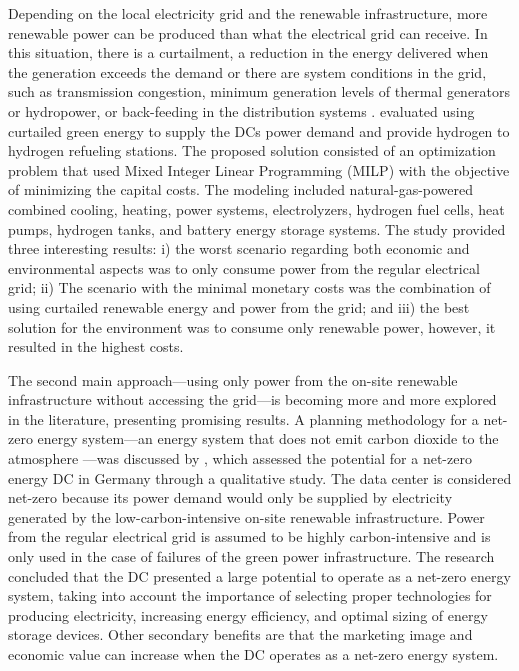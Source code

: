 Depending on the local electricity grid and the renewable infrastructure, more renewable power can be produced than what the electrical grid can receive. In this situation, there is a curtailment, a reduction in the energy delivered when the generation exceeds the demand or there are system conditions in the grid, such as transmission congestion, minimum generation levels of thermal generators or hydropower, or back-feeding in the distribution systems \cite{curtailment_def_2021}. \citet{Niaz2022_curtailment} evaluated using curtailed green energy to supply the DCs power demand and provide hydrogen to hydrogen refueling stations. The proposed solution consisted of an optimization problem that used Mixed Integer Linear Programming (MILP) with the objective of minimizing the capital costs. The modeling included natural-gas-powered combined cooling, heating, power systems, electrolyzers, hydrogen fuel cells, heat pumps, hydrogen tanks, and battery energy storage systems. The study provided three interesting results: i) the worst scenario regarding both economic and environmental aspects was to only consume power from the regular electrical grid; ii) The scenario with the minimal monetary costs was the combination of using curtailed renewable energy and power from the grid; and iii) the best solution for the environment was to consume only renewable power, however, it resulted in the highest costs.


The second main approach---using only power from the on-site renewable infrastructure without accessing the grid---is becoming more and more explored in the literature, presenting promising results. A planning methodology for a net-zero energy system---an energy system that does not emit carbon dioxide to the atmosphere \cite{netzero_energy_system}---was discussed by \citet{Richter2021_netzero_dcs}, which assessed the potential for a net-zero energy DC in Germany through a qualitative study. The data center is considered net-zero because its power demand would only be supplied by electricity generated by the low-carbon-intensive on-site renewable infrastructure. Power from the regular electrical grid is assumed to be highly carbon-intensive and is only used in the case of failures of the green power infrastructure. The research concluded that the DC presented a large potential to operate as a net-zero energy system, taking into account the importance of selecting proper technologies for producing electricity, increasing energy efficiency, and optimal sizing of energy storage devices. Other secondary benefits are that the marketing image and economic value can increase when the DC operates as a net-zero energy system. 

